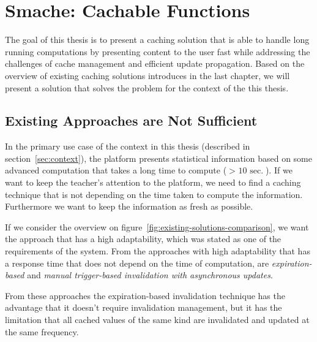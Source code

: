 \chapter{Smache: Cachable Functions}
\label{chapter:smache-cachable-functions}

The goal of this thesis is to present a caching solution that is able to handle long running computations by presenting content to the user fast while addressing the challenges of cache management and efficient update propagation. Based on the overview of existing caching solutions introduces in the last chapter, we will present a solution that solves the problem for the context of the this thesis.



\section{Existing Approaches are Not Sufficient}
\label{sec:existing-approaches-are-not-sufficient}


In the primary use case of the context in this thesis (described in section~\ref{sec:context}), the platform presents statistical information based on some advanced computation that takes a long time to compute ($>\text{ 10 sec.}$). If we want to keep the teacher's attention to the platform, we need to find a caching technique that is not depending on the time taken to compute the information. Furthermore we want to keep the information as fresh as possible.

If we consider the overview on figure~\ref{fig:existing-solutions-comparison}, we want the approach that has a high adaptability, which was stated as one of the requirements of the system. From the approaches with high adaptability that has a response time that does not depend on the time of computation, are \emph{expiration-based} and \emph{manual trigger-based invalidation with asynchronous updates}.

From these approaches the expiration-based invalidation technique has the advantage that it doesn't require invalidation management, but it has the limitation that all cached values of the same kind are invalidated and updated at the same frequency.

